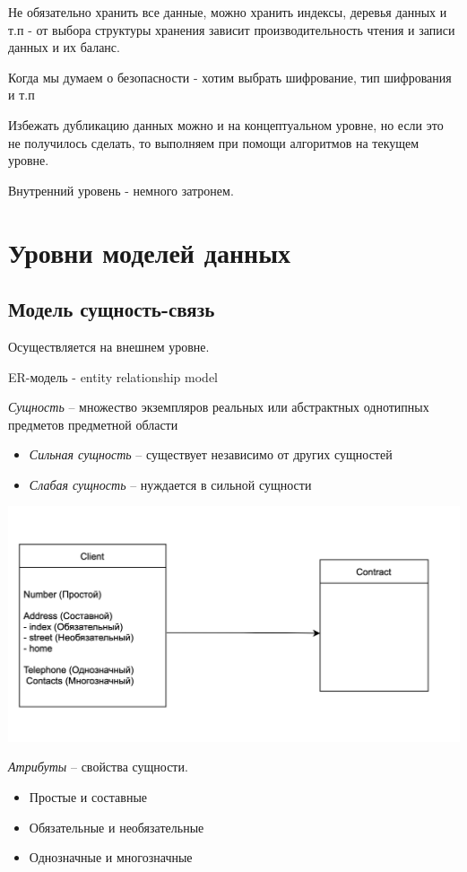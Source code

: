\documentclass[12pt, a4paper]{article}
\begin{document}
Не обязательно хранить все данные, можно хранить индексы, деревья данных и т.п - от выбора структуры хранения зависит производительность чтения и записи данных и их баланс.

Когда мы думаем о безопасности - хотим выбрать шифрование, тип шифрования и т.п

Избежать дубликацию данных можно и на концептуальном уровне, но если это не получилось сделать, то выполняем  при помощи алгоритмов на текущем уровне.

Внутренний уровень - немного затронем.

\section{Уровни моделей данных}

\subsection{Модель сущность-связь}
Осуществляется на внешнем уровне.

ER-модель - entity relationship model

\emph{Сущность} -- множество экземпляров реальных или абстрактных однотипных предметов предметной области
\begin{itemize}
    \item \emph{Сильная сущность} -- существует независимо от других сущностей
    \item \emph{Слабая сущность} -- нуждается в сильной  сущности
\end{itemize}

\includegraphics[scale=0.55]{data/client_1.png}

\emph{Атрибуты} -- свойства сущности.

\begin{itemize}
    \item Простые и составные
    \item Обязательные и необязательные
    \item Однозначные и многозначные
\end{itemize}
\end{document}
